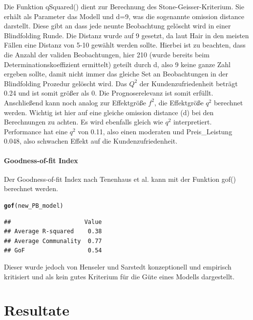 \documentclass{article}\usepackage[]{graphicx}\usepackage[]{color}
\makeatletter
\newcommand{\hlstd}[1]{\textcolor[rgb]{0.345,0.345,0.345}{#1}}%
\newcommand{\hlkwd}[1]{\textcolor[rgb]{0.737,0.353,0.396}{\textbf{#1}}}%
\newenvironment{kframe}{%
 \def\at@end@of@kframe{}%
 \ifinner\ifhmode%
  \def\at@end@of@kframe{\end{minipage}}%
  \begin{minipage}{\columnwidth}%
 \fi\fi%
 \def\FrameCommand##1{\hskip\@totalleftmargin \hskip-\fboxsep
 \colorbox{shadecolor}{##1}\hskip-\fboxsep
     \hskip-\linewidth \hskip-\@totalleftmargin \hskip\columnwidth}%
 \MakeFramed {\advance\hsize-\width
   \@totalleftmargin\z@ \linewidth\hsize
   \@setminipage}}%
 {\par\unskip\endMakeFramed%
 \at@end@of@kframe}
\newenvironment{knitrout}{}{} %
\makeatother
\begin{document}
Die Funktion qSquared() dient zur Berechnung des Stone-Geisser-Kriterium. Sie erhält als Parameter das Modell und d=9, was die sogenannte omission distance darstellt. Diese gibt an dass jede neunte Beobachtung gelöscht wird in einer Blindfolding Runde. Die Distanz wurde auf 9 gesetzt, da laut Hair\cite{hair2012assessment} in den meisten Fällen eine Distanz von 5-10 gewählt werden sollte. Hierbei ist zu beachten, dass die Anzahl der validen Beobachtungen, hier 210 (wurde bereits beim Determinationskoeffizient ermittelt) geteilt durch d, also 9 keine ganze Zahl ergeben sollte, damit nicht immer das gleiche Set an Beobachtungen in der Blindfolding Prozedur gelöscht wird. Das $Q^{2}$ der Kundenzufriedenheit beträgt 0.24 und ist somit größer als 0. Die Prognoserelevanz ist somit erfüllt. Anschließend kann noch analog zur Effektgröße $f^{2}$, die Effektgröße $q^{2}$ berechnet werden. Wichtig ist hier auf eine gleiche omission distance (d) bei den Berechnungen zu achten. Es wird ebenfalls gleich wie $q^{2}$ interpretiert. Performance hat eine $q^{2}$ von 0.11, also einen moderaten und Preis\_Leistung 0.048, also schwachen Effekt auf die Kundenzufriedenheit.

\paragraph{Goodness-of-fit Index}
Der Goodness-of-fit Index nach Tenenhaus et al.\cite{tenenhaus2004global} kann mit der Funktion gof() berechnet werden.
\begin{knitrout}
\color{fgcolor}\begin{kframe}
\begin{alltt}
\hlkwd{gof}\hlstd{(new_PB_model)}
\end{alltt}
\begin{verbatim}
##                     Value
## Average R-squared    0.38
## Average Communality  0.77
## GoF                  0.54
\end{verbatim}
\end{kframe}
\end{knitrout}
Dieser wurde jedoch von Henseler und Sarstedt konzeptionell und empirisch kritisiert und als kein gutes Kriterium für die Güte eines Modells dargestellt.\cite{henseler2013goodness} 




\newpage
\section{Resultate}%
\end{document}
